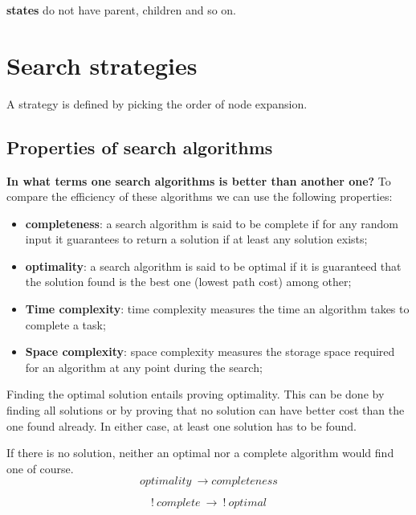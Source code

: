 \documentclass{article}
\begin{document}
\begin{flushleft}
    \textbf{states} do not have parent, children and so on.
\end{flushleft}

\newpage

\section{Search strategies}

A strategy is defined by picking the order of node expansion.

\subsection{Properties of search algorithms}

\textbf{In what terms one search algorithms is better than another one?} To compare the efficiency of these algorithms we can use the following properties:

\begin{itemize}
    \item \textbf{completeness}: a search algorithm is said to be complete if for any random input it guarantees to return a solution if at least any solution exists;
    \item \textbf{optimality}: a search algorithm is said to be optimal if it is guaranteed that the solution found is the best one (lowest path cost) among other; 
    \item \textbf{Time complexity}: time complexity measures the time an algorithm takes to complete a task;
    \item \textbf{Space complexity}: space complexity measures the storage space required for an algorithm at any point during the search;
\end{itemize}

Finding the optimal solution entails proving optimality. This can be done by finding all solutions or by proving that no solution can have better cost than the one found already. In either case, at least one solution has to be found.

If there is no solution, neither an optimal nor a complete algorithm would find one of course.
\begin{equation}
    optimality\ \rightarrow completeness
\end{equation}

\begin{equation}
    !\ complete\ \rightarrow\ !\ optimal
\end{equation}
\end{document}
